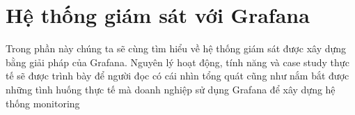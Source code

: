 \chapter{Hệ thống giám sát với Grafana}
Trong phần này chúng ta sẽ cùng tìm hiểu về hệ thống giám sát được xây dựng bằng giải pháp của Grafana. Nguyên lý hoạt động, tính năng và case study thực tế sẽ được trình bày để người đọc có cái nhìn tổng quát cũng như nắm bắt được những tình huống thực tế mà doanh nghiệp sử dụng Grafana để xây dựng hệ thống monitoring



